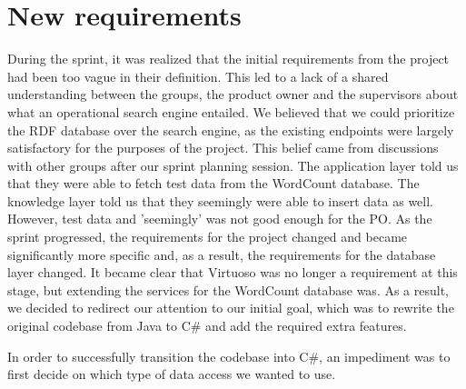 \section{New requirements} \label{ssec:newRequirements}
During the sprint, it was realized that the initial requirements from the \knox{} project had been too vague in their definition. 
This led to a lack of a shared understanding between the groups, the product owner and the supervisors about what an operational search engine entailed.  
We believed that we could prioritize the RDF database over the search engine, as the existing endpoints were largely satisfactory for the purposes of the project. This belief came from discussions with other groups after our sprint planning session. The application layer told us that they were able to fetch test data from the WordCount database. The knowledge layer told us that they seemingly were able to insert data as well.
However, test data and 'seemingly' was not good enough for the \knox{} PO.
As the sprint progressed, the requirements for the \knox{} project changed and became significantly more specific and, as a result, the requirements for the database layer changed.
It became clear that Virtuoso was no longer a requirement at this stage, but extending the services for the WordCount database was.
As a result, we decided to redirect our attention to our initial goal, which was to rewrite the original codebase from Java to C\# and add the required extra features.

In order to successfully transition the codebase into C\#, an impediment was to first decide on which type of data access we wanted to use.

